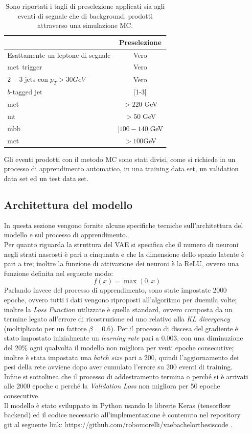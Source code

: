 \begin{table}[h!]
	\centering
	\begin{tabular}{lc}
		\hline
		&Preselezione \\
		\hline
		Esattamente un leptone di segnale&Vero\\
		met\ trigger&Vero\\
		$2-3$ jets con $p_{T}>30 GeV$&Vero\\
		$b$-tagged jet&[1-3]\\
		met\ &$> 220$ GeV\\
		mt\ &$> 50$ GeV\\
		mbb\ &[$100-140$]GeV\\
		mct\ &$>100$GeV\\
		\hline
	\end{tabular}
	\caption{Sono riportati i tagli di preselezione applicati sia agli eventi di segnale che di background, prodotti attraverso una simulazione MC.}
	\label{tab:tagli di preselezione}
\end{table} 
Gli eventi prodotti con il metodo MC sono stati divisi, come si richiede in un processo di apprendimento automatico, in una training data set, un validation data set ed un test data set.

\subsection{Architettura del modello}
\label{architettura del modello}
In questa sezione vengono fornite alcune specifiche tecniche sull'architettura del modello e sul processo di apprendimento.\\
Per quanto riguarda la struttura del VAE si specifica che il numero di neuroni negli strati nascosti è pari a cinquanta e che la dimensione dello spazio latente è pari a tre; inoltre la funzione di attivazione dei neuroni è la ReLU, ovvero una funzione definita nel seguente modo:
\begin{equation}
	f(x) = \max(0,x)
\end{equation} 
Parlando invece del processo di apprendimento, sono state impostate 2000 epoche, ovvero tutti i dati vengono riproposti all'algoritmo per duemila volte; inoltre la \textit{Loss Function} utilizzate è quella standard, ovvero composta da un termine legato all'errore di ricostruzione ed uno relativo alla \textit{KL divergency} (moltiplicato per un fattore $\beta=0.6$). Per il processo di discesa del gradiente è stato impostato inizialmente un \textit{learning rate} pari a 0.003, con una diminuzione del 20\% ogni qualvolta il modello non migliora per venti epoche consecutive; inoltre è stata impostata una \textit{batch size} pari a 200, quindi l'aggiornamento dei pesi della rete avviene dopo aver cumulato l'errore su 200 eventi di training. Infine si sottolinea che il processo di addestramento termina o perché si è arrivati alle 2000 epoche o perché la \textit{Validation Loss} non migliora per 50 epoche consecutive.\\
Il modello è stato sviluppato in Python usando le librerie Keras (tensorflow backend) ed il codice necessario all'implementazione è contenuto nel repository git al seguente link: https://github.com/robomorelli/vae\textunderscore bachelor\textunderscore thesis\textunderscore code \cite{Codice}.


